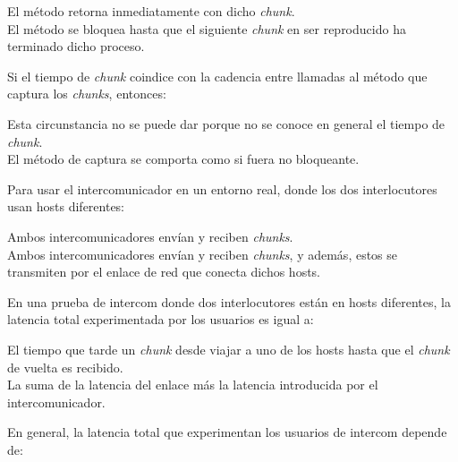 \documentclass[legalpaper, 12pt, addpoints]{exam}
\begin{document}
\begin{questions}
\begin{oneparchoices}
  \choice El método retorna inmediatamente con dicho \emph{chunk}.\\
  \choice El método se bloquea hasta que el siguiente \emph{chunk} en ser reproducido ha terminado dicho proceso.
\end{oneparchoices}
  
\vspace{0.10in}

\question Si el tiempo de \emph{chunk} coindice con la cadencia entre llamadas al método que captura los \emph{chunks}, entonces:

\begin{oneparchoices}
  \choice Esta circunstancia no se puede dar porque no se conoce en general el tiempo de \emph{chunk}.\\
  \choice El método de captura se comporta como si fuera no bloqueante.
\end{oneparchoices}
  
\vspace{0.10in}

\question Para usar el intercomunicador en un entorno real, donde los dos interlocutores usan hosts diferentes:

\begin{oneparchoices}
  \choice Ambos intercomunicadores envían y reciben \emph{chunks}.\\
  \choice Ambos intercomunicadores envían y reciben \emph{chunks}, y además, estos se transmiten por el enlace de red que conecta dichos hosts.
\end{oneparchoices}
  
\vspace{0.10in}

\question En una prueba de intercom donde dos interlocutores están en hosts diferentes, la latencia total experimentada por los usuarios es igual a:

\begin{oneparchoices}
  \choice El tiempo que tarde un \emph{chunk} desde viajar a uno de los hosts hasta que el \emph{chunk} de vuelta es recibido.\\
  \choice La suma de la latencia del enlace más la latencia introducida por el intercomunicador.
\end{oneparchoices}
  
\vspace{0.10in}

\question En general, la latencia total que experimentan los usuarios de intercom depende de:


\end{questions}
\end{document}
